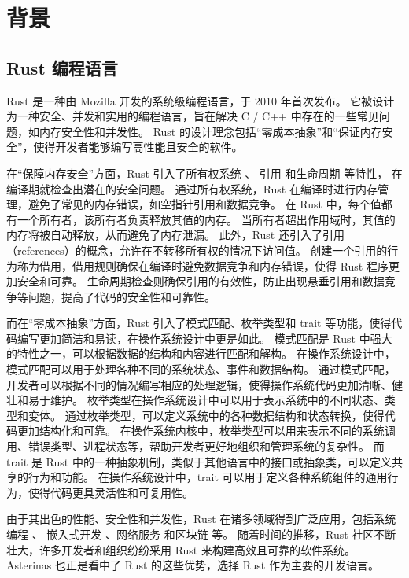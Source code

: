 
\chapter{背景}
\section{Rust 编程语言}
Rust\parencite{matsakis2014rust} 是一种由 Mozilla 开发的系统级编程语言，于 2010 年首次发布。
它被设计为一种安全、并发和实用的编程语言，旨在解决 C / C++ 中存在的一些常见问题，如内存安全性和并发性。
Rust 的设计理念包括“零成本抽象”和“保证内存安全”，使得开发者能够编写高性能且安全的软件。

在“保障内存安全”方面，Rust 引入了所有权系统\parencite{rust_owner}\parencite{rust_owner1} 、
引用\parencite{rust_ref} 和生命周期\parencite{rust_lifetime}\parencite{rust_lifetime1} 等特性，
在编译期就检查出潜在的安全问题。
通过所有权系统，Rust 在编译时进行内存管理，避免了常见的内存错误，如空指针引用和数据竞争。
在 Rust 中，每个值都有一个所有者，该所有者负责释放其值的内存。
当所有者超出作用域时，其值的内存将被自动释放，从而避免了内存泄漏。
此外，Rust 还引入了引用（references）的概念，允许在不转移所有权的情况下访问值。
创建一个引用的行为称为借用，借用规则确保在编译时避免数据竞争和内存错误，使得 Rust 程序更加安全和可靠。
生命周期检查则确保引用的有效性，防止出现悬垂引用和数据竞争等问题，提高了代码的安全性和可靠性。

而在“零成本抽象”方面，Rust 引入了模式匹配\parencite{rust_match}、枚举类型\parencite{rust_enum}和 trait\parencite{rust_trait} 等功能，使得代码编写更加简洁和易读，在操作系统设计中更是如此。
模式匹配是 Rust 中强大的特性之一，可以根据数据的结构和内容进行匹配和解构。
在操作系统设计中，模式匹配可以用于处理各种不同的系统状态、事件和数据结构。
通过模式匹配，开发者可以根据不同的情况编写相应的处理逻辑，使得操作系统代码更加清晰、健壮和易于维护。
枚举类型在操作系统设计中可以用于表示系统中的不同状态、类型和变体。
通过枚举类型，可以定义系统中的各种数据结构和状态转换，使得代码更加结构化和可靠。
在操作系统内核中，枚举类型可以用来表示不同的系统调用、错误类型、进程状态等，帮助开发者更好地组织和管理系统的复杂性。
而 trait 是 Rust 中的一种抽象机制，类似于其他语言中的接口或抽象类，可以定义共享的行为和功能。
在操作系统设计中，trait 可以用于定义各种系统组件的通用行为，使得代码更具灵活性和可复用性。

由于其出色的性能、安全性和并发性，Rust 在诸多领域得到广泛应用，包括系统编程\parencite{balasubramanian2017system} 、
嵌入式开发\parencite{borgsmuller2021rust} 、网络服务\parencite{chanda2018network} 和区块链\parencite{rusch2019themis} 等。
随着时间的推移，Rust 社区不断壮大，许多开发者和组织纷纷采用 Rust 来构建高效且可靠的软件系统。
Asterinas 也正是看中了 Rust 的这些优势，选择 Rust 作为主要的开发语言。

